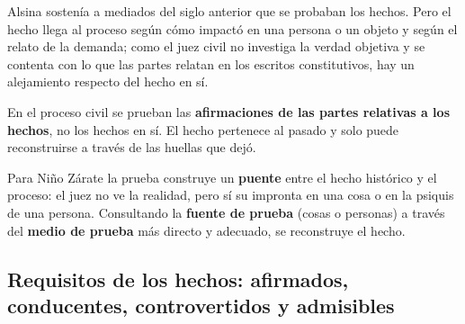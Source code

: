 \documentclass[12pt,oneside]{book}
\begin{document}
Alsina sostenía a mediados del siglo anterior que se probaban los hechos. Pero el hecho llega al proceso según cómo impactó en una persona o un objeto y según el relato de la demanda; como el juez civil no investiga la verdad objetiva y se contenta con lo que las partes relatan en los escritos constitutivos, hay un alejamiento respecto del hecho en sí.

\begin{important}
En el proceso civil se prueban las \textbf{afirmaciones de las partes relativas a los hechos}, no los hechos en sí. El hecho pertenece al pasado y solo puede reconstruirse a través de las huellas que dejó.
\end{important}

Para Niño Zárate la prueba construye un \textbf{puente} entre el hecho histórico y el proceso: el juez no ve la realidad, pero sí su impronta en una cosa o en la psiquis de una persona. Consultando la \textbf{fuente de prueba} (cosas o personas) a través del \textbf{medio de prueba} más directo y adecuado, se reconstruye el hecho.

\subsection{Requisitos de los hechos: afirmados, conducentes, controvertidos y admisibles}
\end{document}
